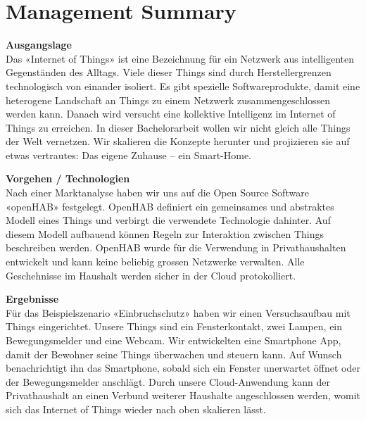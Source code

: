 
\chapter*{Management Summary}
\textbf{Ausgangslage}\\
Das «Internet of Things» ist eine Bezeichnung für ein Netzwerk aus intelligenten Gegenständen des Alltags. Viele dieser Things sind durch Herstellergrenzen technologisch von einander isoliert. Es gibt spezielle Softwareprodukte, damit eine heterogene Landschaft an Things zu einem Netzwerk zusammengeschlossen werden kann. Danach wird versucht eine kollektive Intelligenz im Internet of Things zu erreichen. In dieser Bachelorarbeit wollen wir nicht gleich alle Things der Welt vernetzen. Wir skalieren die Konzepte herunter und projizieren sie auf etwas vertrautes: Das eigene Zuhause -- ein Smart-Home. 

\textbf{Vorgehen / Technologien}\\
Nach einer Marktanalyse haben wir uns auf die Open Source Software «openHAB» festgelegt. OpenHAB definiert ein gemeinsames und abstraktes Modell eines Things und verbirgt die verwendete Technologie dahinter. Auf diesem Modell aufbauend können Regeln zur Interaktion zwischen Things beschreiben werden. OpenHAB wurde für die Verwendung in Privathaushalten entwickelt und kann keine beliebig grossen Netzwerke verwalten. Alle Geschehnisse im Haushalt werden sicher in der Cloud protokolliert.

\textbf{Ergebnisse}\\
Für das Beispielszenario «Einbruchschutz» haben wir einen Versuchsaufbau mit Things eingerichtet. Unsere Things sind ein Fensterkontakt, zwei Lampen, ein Bewegungsmelder und eine Webcam. Wir entwickelten eine Smartphone App, damit der Bewohner seine Things überwachen und steuern kann. Auf Wunsch benachrichtigt ihn das Smartphone, sobald sich ein Fenster unerwartet öffnet oder der Bewegungsmelder anschlägt. Durch unsere Cloud-Anwendung kann der Privathaushalt an einen Verbund weiterer Haushalte angeschlossen werden, womit sich das Internet of Things wieder nach oben skalieren lässt. 
